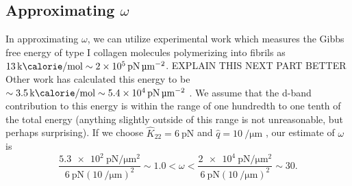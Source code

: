 \documentclass[12pt]{article}
\begin{document}
\subsection{Approximating $\omega$}
In approximating $\omega$, we can utilize experimental work \cite{Kadler:1987ui} which measures the Gibbs free energy of type I collagen molecules polymerizing into fibrils as $\SI{13}{\kilo\calorie\per\mole}\sim\SI{2e5}{\pico\newton\per\micro\meter\squared}$. EXPLAIN THIS NEXT PART BETTER Other work has calculated this energy to be $\sim\SI{3.5}{\kilo\calorie\per\mole}\sim\SI{5.4e4}{\pico\newton\per\micro\meter\squared}$ \cite{Leikin:1995id}. We assume that the d-band contribution to this energy is within the range of one hundredth to one tenth of the total energy (anything slightly outside of this range is not unreasonable, but perhaps surprising). If we choose $\hat{K}_{22}=\SI{6}{\pico\newton}$ and $\hat{q}=\SI{10}{\per\micro\meter}$ \cite{Cameron:2018kq}, our estimate of $\omega$ is
\begin{equation}\label{eq:omega}
\frac{\SI{5.3e2}{\pico\newton\per\micro\meter\squared}}{\SI{6}{\pico\newton}\left(\SI{10}{\per\micro\meter}\right)^2}\sim1.0<\omega<\frac{\SI{2e4}{\pico\newton\per\micro\meter\squared}}{\SI{6}{\pico\newton}\left(\SI{10}{\per\micro\meter}\right)^2}\sim30.
\end{equation}
\end{document}
